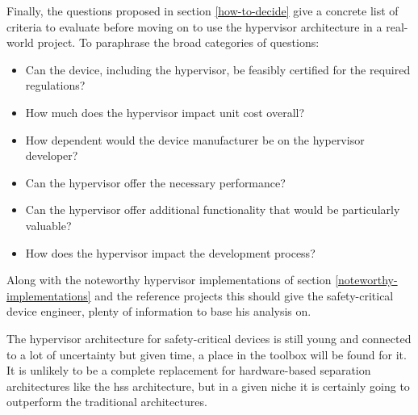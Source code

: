 Finally, the questions proposed in section \ref{how-to-decide} give a concrete list of criteria to evaluate before moving on to use the hypervisor architecture in a real-world project. To paraphrase the broad categories of questions:
\begin{itemize}
    \item Can the device, including the hypervisor, be feasibly certified for the required regulations?
    \item How much does the hypervisor impact unit cost overall?
    \item How dependent would the device manufacturer be on the hypervisor developer?
    \item Can the hypervisor offer the necessary performance?
    \item Can the hypervisor offer additional functionality that would be particularly valuable?
    \item How does the hypervisor impact the development process?
\end{itemize}
Along with the noteworthy hypervisor implementations of section \ref{noteworthy-implementations} and the reference projects this should give the safety-critical device engineer, plenty of information to base his analysis on. 

The hypervisor architecture for safety-critical devices is still young and connected to a lot of uncertainty but given time, a place in the toolbox will be found for it. It is unlikely to be a complete replacement for hardware-based separation architectures like the \acrshort{hss} architecture, but in a given niche it is certainly going to outperform the traditional architectures.


\begin{comment} 
* Mixed criticality has been present for a long time in very complex projects but with increased processing power and user demands it makes more and more sense in smaller devices.
* For this reason and because of efforts in some industries to save SWaP alternate solutions to the mixed criticality problem have been seeing some adoption.
* One of these is the hypervisor that this thesis set out to compare more in-depth.
* From that comparison the crucial differences and their effects emerged
* [Refer to conclusion from that section]
* Based on this some reference project have been proposed that can be categorized into these [] categories.
* Ultimately it can be said the hypervisor has a couple of very promising places of application.
* So it can be said the best scenarios for the hypervisor architecture are the ones where this happens: []
* The advent of microkernel based safety hypervisors along with the maturation in virtualization technology, especially in the embedded space provides an avenue to deal with the problems that arise from mixed criticality.
\end{comment}
